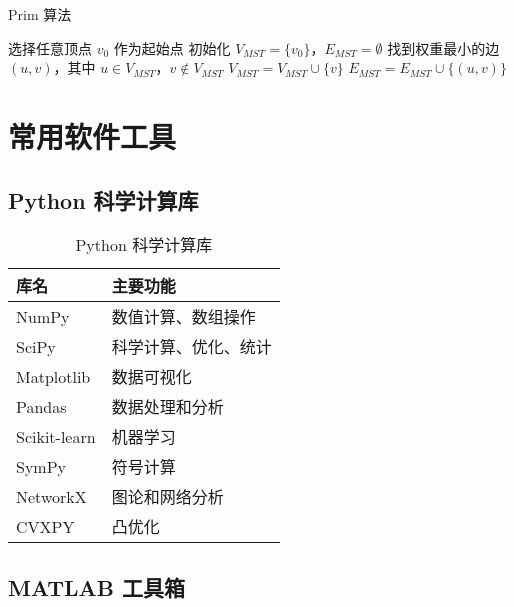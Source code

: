 \begin{algorithm}[H]
\caption{Prim 算法}\label{alg:prim}
\begin{algorithmic}[1]
\State 选择任意顶点 $v_0$ 作为起始点
\State 初始化 $V_{MST} = \{v_0\}$，$E_{MST} = \emptyset$
    \State 找到权重最小的边 $(u, v)$，其中 $u \in V_{MST}$，$v \notin V_{MST}$
    \State $V_{MST} = V_{MST} \cup \{v\}$
    \State $E_{MST} = E_{MST} \cup \{(u, v)\}$
\EndWhile
\end{algorithmic}
\end{algorithm}

\section{常用软件工具}\label{app:software-tools}

\subsection{Python 科学计算库}

\begin{table}[htbp]
    \centering
    \caption{Python 科学计算库}
    \label{tab:python-libraries}
    \begin{tabular}{@{}ll@{}}
        \toprule
        库名 & 主要功能 \\
        \midrule
        NumPy & 数值计算、数组操作 \\
        SciPy & 科学计算、优化、统计 \\
        Matplotlib & 数据可视化 \\
        Pandas & 数据处理和分析 \\
        Scikit-learn & 机器学习 \\
        SymPy & 符号计算 \\
        NetworkX & 图论和网络分析 \\
        CVXPY & 凸优化 \\
        \bottomrule
    \end{tabular}
\end{table}

\subsection{MATLAB 工具箱}

